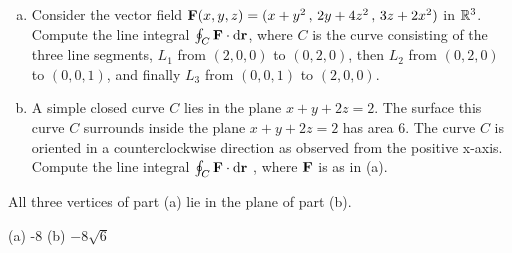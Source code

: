 \begin{question}
\begin{enumerate}[(a)]
\item
Consider the vector field $\mathbf{F}(x, y, z) = (x+y^2\,,\, 2y+4z^2\,,\,3z+2x^2)$ in 
$\mathbb{R}^3$. Compute the line integral $\oint_C \mathbf{F}\cdot\mathrm{d}\mathbf{r}$, where 
$C$ is the curve consisting of the three line segments,
$L_1$ from $(2, 0, 0)$ to $(0, 2, 0)$, then 
$L_2$ from $(0, 2, 0)$ to $(0, 0, 1)$, and finally 
$L_3$ from $(0, 0, 1)$ to $(2, 0, 0)$.
\item
A simple closed curve $C$ lies in the plane $x + y + 2z = 2$. 
The surface this curve $C$ surrounds inside the plane $x + y + 2z = 2$ 
has area $6$. The curve $C$ is oriented in a counterclockwise
direction as observed from the positive x-axis.
Compute the line integral $\oint_C\mathbf{F}\cdot \mathrm{d}\mathbf{r}$ , where $\mathbf{F}$ 
is as in (a).
\end{enumerate}
\end{question}

\begin{hint} 
All three vertices of part (a) lie in the plane of part (b).
\end{hint}

\begin{answer} 
(a) -8\qquad
(b) $-8\sqrt{6}$
\end{answer}


